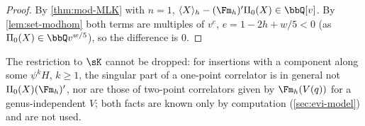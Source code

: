 \begin{proof}
By \cref{thm:mod-MLK} with $n=1$, $\langle X\rangle_h-(\Fm_h)'\Pi_0(X)\in\bbQ[v]$. By \cref{lem:set-modhom} both terms are multiples of $v^e$, $e=1-2h+w/5<0$ (as $\Pi_0(X)\in\bbQ v^{w/5}$), so the difference is $0$.
\end{proof}

\begin{rmk}[Off $\sK$]
\label{rmk:mod-offK}
The restriction to $\sK$ cannot be dropped: for insertions with a component along some $\psi^kH$, $k\geq 1$, the singular part of a one-point correlator is in general not $\Pi_0(X)(\Fm_h)'$, nor are those of two-point correlators given by $\Fm_h(V(q))$ for a genus-independent $V$; both facts are known only by computation (\cref{sec:evi-model}) and are not used.
\end{rmk}
